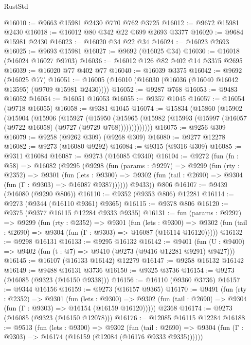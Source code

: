 \begin{lexlean}{RustStd}
\begin{coremodule}
@16010 := @9663 @15981 @2430 @770 @762 @3725
@16012 := @9672 @15981 @2430
@16018 := @16012 @80 @342 @22 @699 @2693 @3377
@16020 := @9684 @15981 @2430
@16023 := @16020 @34 @22 @34
@16024 := @16023 @2693
@16025 := @9693 @15981
@16027 := @9692 (@16025 @34)
@16030 := @16018 (@16024 @16027 @9703)
@16036 := @16012 @126 @82 @402 @14 @3375 @2695
@16039 := @16020 @77 @402 @77
@16040 := @16039 @3375
@16042 := @9692 (@16025 @77)
@16051 := @16005 (@16010 (@16030 (@16036 (@16040 @16042 @13595) (@9709 @15981 @2430))))
@16052 := @9287 @768
@16053 := @9483 @16052
@16054 := @16051 @16053
@16055 := @9357 @1045
@16057 := @16054 (@9718 @16055)
@16058 := @9381 @1045
@16074 := @15834
    (@15860
      (@15902
        (@15904
          (@15906
            (@15927
              (@15950
                (@15965
                  (@15982 (@15993 (@15997 (@16057 (@9722 @16058) (@9727 (@9729 @768)))))))))))))
@16075 := @9256 @309
@16079 := @9258 (@9262 @309) (@9268 @309)
@16080 := @9277 @12278
@16082 := @9273 (@16080 @9292)
@16084 := @9315 (@9316 @309)
@16085 := @9311 @16084
@16087 := @9273 (@16085 @9340)
@16104 := @9272
    (fun (fn : @58) =>
    @16082
      (@9295
        (@9298
          (fun (params : @9297) =>
          @9299
            (fun (rty : @2352) =>
            @9301
              (fun (lets : @9300) =>
              @9302 (fun (tail : @2690) => @9304 (fun (Γ : @9303) => @16087 @9387))))))
        @9433))
    @806
@16107 := @9439 (@16080 (@9290 @806))
@16110 := @9352 (@9353 @806) @12281
@16114 := @9273 (@9344 (@16110 @9361) @9365)
@16115 := @9378 @806
@16120 := @9375 (@9377 @16115 @12284 @9333 @9335)
@16131 := fun (params : @9297) =>
  @9299
    (fun (rty : @2352) =>
    @9301
      (fun (lets : @9300) =>
      @9302 (fun (tail : @2690) => @9304 (fun (Γ : @9303) => @16087 (@16114 @16120)))))
@16132 := @9298 @16131
@16133 := @9295 @16132
@16142 := @9401
    (fun (U : @9400) => @9402 (fun (t : @7) => @9410 (@9273 (@9416 @12281 @9291) @9427)))
@16145 := @16107 (@16133 @16142) @12279
@16147 := @9258 @16132 @16142
@16149 := @9488 @16131 @3736
@16150 := @9325 @3736
@16154 := @9273 (@16085 (@9323 (@16150 @9338)))
@16156 := @16110 (@9360 @3736)
@16157 := @9344 @16156
@16159 := @9273 (@16157 @9365)
@16170 := @9491
    (fun (rty : @2352) =>
    @9301
      (fun (lets : @9300) =>
      @9302 (fun (tail : @2690) => @9304 (fun (Γ : @9303) => @16154 (@16159 @16120)))))
    @2368
@16174 := @9273 (@16085 (@9323 (@16150 @12078)))
@16176 := @12085 @16115 @12284
@16188 := @9513
    (fun (lets : @9300) =>
    @9302
      (fun (tail : @2690) =>
      @9304 (fun (Γ : @9303) => @16174 (@16159 (@12084 (@16176 @9333 @9335))))))

\end{coremodule}
\end{lexlean}
